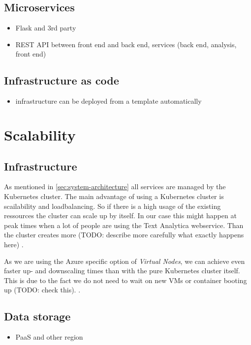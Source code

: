 \documentclass[conference]{IEEEtran}
\begin{document}
\subsection{Microservices}
\begin{itemize}
	\item Flask and 3rd party
	\item REST API between front end and back end,  services (back end, analysis, front end)
\end{itemize}

\subsection{Infrastructure as code}
\begin{itemize}
	\item infrastructure can be deployed from a template automatically
\end{itemize}

\section{Scalability}
\label{sec:scalability}
\subsection{Infrastructure}
As mentioned in \cref{sec:system-architecture} all services are managed by the Kubernetes cluster.
The main advantage of using a Kubernetes cluster is scailability and loadbalancing. So if there is a high usage of the
existing ressources the cluster can scale up by itself. In our case this might happen at peak times when a lot of people
are using the Text Analytica webservice. Than the cluster creates more (TODO:  describe more carefully what exactly happens here)
\cite{MicrosoftAzureKubernetesService}.

As we are using the Azure specific option of \textit{Virtual Nodes}, we can achieve even faster up- and downscaling times
than with the pure Kubernetes cluster itself. This is due to the fact we do not need to wait on new VMs or container booting up (TODO: check this).
\cite{MicrosoftVirtualNode}.

\subsection{Data storage}
\begin{itemize}
	\item PaaS and other region
\end{itemize}
\end{document}
